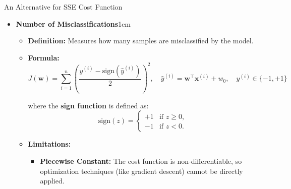\documentclass[serif, aspectratio=169]{beamer}
\begin{document}
    \begin{frame}{An Alternative for SSE Cost Function}
        \begin{itemize}
            \item \textbf{Number of Misclassifications}\itemsep1em
            \medskip
            \begin{itemize}\itemsep0.8em
            \item \textbf{Definition:}
            Measures how many samples are misclassified by the model.

            \item \textbf{Formula:}
            \[
                J(\mathbf{w}) = \sum_{i=1}^{n} \left( \frac{y^{(i)} - \text{sign}(\hat{y}^{(i)})}{2} \right)^2, \quad
                \hat{y}^{(i)} = \mathbf{w}^\top \mathbf{x}^{(i)} + w_0, \quad y^{(i)} \in \{-1, +1\}
            \]

            where the \textbf{sign function} is defined as:
            \[
                \text{sign}(z) =
                \begin{cases}
                    +1 & \text{if } z \ge 0, \\
                    -1 & \text{if } z < 0.
                \end{cases}
            \]

            \item \textbf{Limitations:}
            \begin{itemize}
                \item \justifying \textbf{Piecewise Constant:}
                The cost function is non-differentiable, so optimization techniques (like gradient descent) cannot be directly applied.
            \end{itemize}

            \end{itemize}
        \end{itemize}


    \end{frame}
\end{document}

